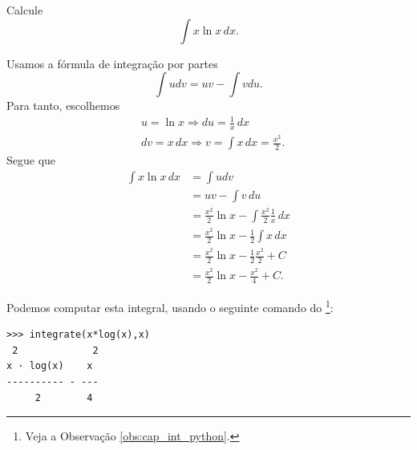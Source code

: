 \begin{exeresol}
  Calcule
  \begin{equation}
    \int x\ln x\,dx.
  \end{equation}
\end{exeresol}
\begin{resol}
  Usamos a fórmula de integração por partes
  \begin{equation}
    \int udv = uv - \int vdu.
  \end{equation}
  Para tanto, escolhemos
  \begin{align}
    &u = \ln x \Rightarrow du = \frac{1}{x}\,dx\\
    &dv = x\,dx \Rightarrow v = \int x\,dx = \frac{x^2}{2}.
  \end{align}
  Segue que
  \begin{align}
    \int x\ln x\,dx &= \int udv\\
                    &= uv - \int v\,du\\
                    &= \frac{x^2}{2}\ln x - \int \frac{x^2}{2}\frac{1}{x}\,dx\\
                    &= \frac{x^2}{2}\ln x - \frac{1}{2}\int x\,dx\\
                    &= \frac{x^2}{2}\ln x - \frac{1}{2}\frac{x^2}{2} + C\\
                    &= \frac{x^2}{2}\ln x - \frac{x^2}{4} + C.
  \end{align}

  \ifispython
  Podemos computar esta integral, usando o seguinte comando do \sympy\footnote{Veja a Observação \ref{obs:cap_int_python}.}:
\begin{verbatim}
>>> integrate(x*log(x),x)
 2             2
x · log(x)    x
---------- - ---
     2        4
\end{verbatim}
  \fi
\end{resol}

